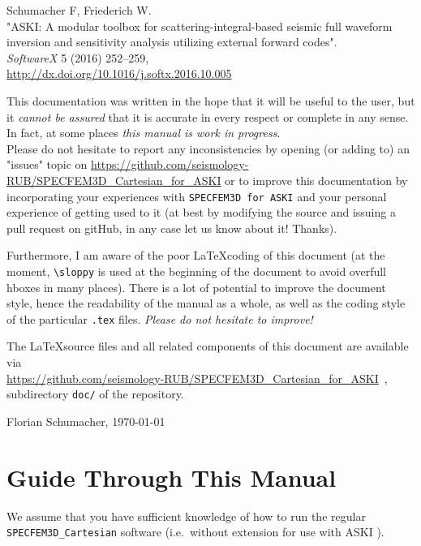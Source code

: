 \documentclass[12pt,a4paper]{article}
\newcommand{\lcode}[1]{\nolinkurl{#1}}
\newcommand{\ASKI}{ {\ttfamily ASKI} }
\begin{document}
Schumacher F, Friederich W.\\
"ASKI: A modular toolbox for scattering-integral-based seismic full waveform 
inversion and sensitivity analysis utilizing external forward codes".\\
\emph{SoftwareX} 5 (2016) 252--259,\\
\url{http://dx.doi.org/10.1016/j.softx.2016.10.005}

\vspace{1em}

This documentation was written in the hope that it will be useful to the user,
but it \emph{cannot be assured} that it is accurate in every respect or complete in any sense.
In fact, at some places \emph{this manual is work in progress}.\\
Please do not hesitate to report any inconsistencies by
opening (or adding to) an "issues" topic on \url{https://github.com/seismology-RUB/SPECFEM3D_Cartesian_for_ASKI}
or to improve this documentation by incorporating your experiences with \lcode{SPECFEM3D for ASKI} 
and your personal experience of getting used to it (at best by modifying the source and issuing a pull request
on gitHub, in any case let us know about it! Thanks).

Furthermore, I am aware of the poor \LaTeX coding of this document (at the moment, \verb+\sloppy+ is used
at the beginning of the document to avoid overfull hboxes in many places). There is a lot of potential
to improve the document 
style, hence the readability of the manual as a whole, as well as the coding style of the 
particular \lcode{.tex} files. \emph{Please do not hesitate to improve!}

The \LaTeX source files and all related components of this document are available via\\
\url{https://github.com/seismology-RUB/SPECFEM3D_Cartesian_for_ASKI}~, subdirectory 
\lcode{doc/} of the repository.
\begin{flushright}
Florian Schumacher, \mydate \today
\end{flushright}

\newpage
%
\section*{Guide Through This Manual}
%
We assume that you have sufficient knowledge of how to run the regular \lcode{SPECFEM3D_Cartesian} software
(i.e.\ without extension for use with \ASKI{}).
\end{document}
